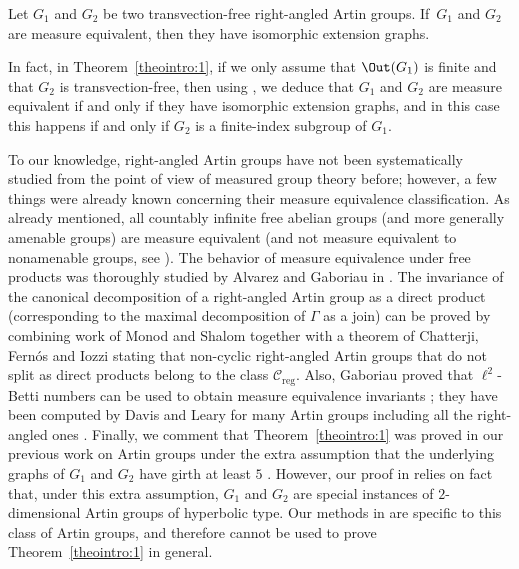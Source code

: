 \begin{theointro}\label{theointro:main}
Let $G_1$ and $G_2$ be two transvection-free right-angled Artin groups. If~$G_1$ and $G_2$ are measure equivalent, then they have isomorphic extension graphs.
\end{theointro}

In fact, in Theorem~\ref{theointro:1}, if we only assume that $\Out(G_1)$ is finite and that $G_2$ is transvection-free, then using \cite[Th.\,1.2]{Hua}, we deduce that $G_1$ and $G_2$ are measure equivalent if and only if they have isomorphic extension graphs, and in this case this happens if and only if $G_2$ is a finite-index subgroup of $G_1$.

To our knowledge, right-angled Artin groups have not been systematically studied from the point of view of measured group theory before; however, a few things were already known concerning their measure equivalence classification. As already mentioned, all countably infinite free abelian groups (and more generally amenable groups) are measure equivalent \cite{Dye2,OW} (and not measure equivalent to nonamenable groups, see \eg \cite[Cor.\,3.2]{Fur-survey}). The behavior of measure equivalence under free products was thoroughly studied by Alvarez and Gaboriau in \cite{AG}. The invariance of the canonical decomposition of a right-angled Artin group as a direct product (corresponding to the maximal decomposition of $\Gamma$ as a join) can be proved by combining work of Monod and Shalom \cite[Th\,1.16 \& 1.17]{MS} together with a theorem of Chatterji, Fernós and Iozzi \cite[Cor.\,1.8]{CFI} stating that non-cyclic right-angled Artin groups that do not split as direct products belong to the class $\mathcal{C}_{\mathrm{reg}}$. Also, Gaboriau proved that $\ell^2$-Betti numbers can be used to obtain measure equivalence invariants \cite{Gab-betti}; they have been computed by Davis and Leary for many Artin groups including all the right-angled ones \cite{DL}. Finally, we comment that Theorem~\ref{theointro:1} was proved in our previous work on Artin groups under the extra assumption that the underlying graphs of $G_1$ and $G_2$ have girth at least $5$ \cite[Cor.\,10.3]{HH}. However, our proof in \cite{HH} relies on fact that, under this extra assumption, $G_1$ and $G_2$ are special instances of $2$-dimensional Artin groups of hyperbolic type. Our methods in \cite{HH} are specific to this class of Artin groups, and therefore cannot be used to prove Theorem~\ref{theointro:1} in general.

